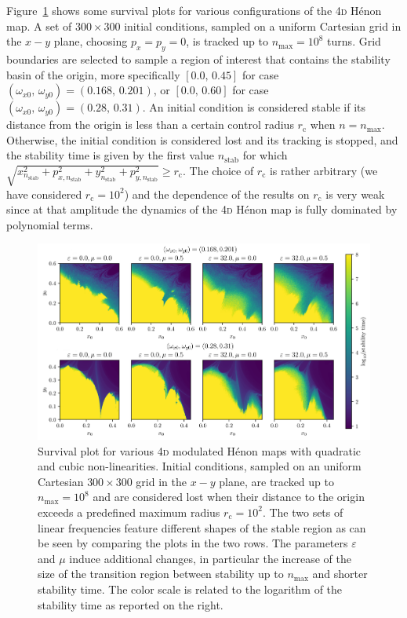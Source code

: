 Figure~\ref{fig:survival} shows some survival plots for various configurations of the 4\textsc{d} Hénon map. A set of $300\times300$ initial conditions, sampled on a uniform Cartesian grid in the $x-y$ plane, choosing $p_x = p_y = 0$, is tracked up to $n_\mathrm{max}=10^8$ turns. Grid boundaries are selected to sample a region of interest that contains the stability basin of the origin, more specifically $[0.0,\,0.45]$ for case $(\omega_{x0},\,\omega_{y0}) = (0.168,\,0.201)$, or $[0.0,\,0.60]$ for case $(\omega_{x0},\,\omega_{y0}) = (0.28,\,0.31)$. An initial condition is considered stable if its distance from the origin is less than a certain control radius $r_\mathrm{c}$ when $n=n_\mathrm{max}$. Otherwise, the initial condition is considered lost and its tracking is stopped, and the stability time is given by the first value $n_\mathrm{stab}$ for which $\sqrt{x^2_{n_\mathrm{stab}}+ p_{x,n_\mathrm{stab}}^2+y_{n_\mathrm{stab}}^2+p_{y,n_\mathrm{stab}}^2}\geq r_\mathrm{c}$. The choice of $r_\mathrm{c}$ is rather arbitrary (we have considered $r_\mathrm{c}=10^2$) and the dependence of the results on $r_\mathrm{c}$ is very weak since at that amplitude the dynamics of the 4\textsc{d} Hénon map is fully dominated by polynomial terms. 
%
\begin{figure}[htp]
    \centering
    \includegraphics[width=\textwidth]{6_dynamic_indicators/fig/stability.png}
    \caption{Survival plot for various 4\textsc{d} modulated Hénon maps with quadratic and cubic non-linearities. Initial conditions, sampled on an uniform Cartesian $300\times300$ grid in the $x-y$ plane, are tracked up to $n_\text{max}=10^8$ and are considered lost when their distance to the origin exceeds a predefined maximum radius $r_\mathrm{c}=10^2$. The two sets of linear frequencies feature different shapes of the stable region as can be seen by comparing the plots in the two rows. The parameters $\varepsilon$ and $\mu$ induce additional changes, in particular the increase of the size of the transition region between stability up to $n_\mathrm{max}$ and shorter stability time. The color scale is related to the logarithm of the stability time as reported on the right.}
    \label{fig:survival}
\end{figure}
